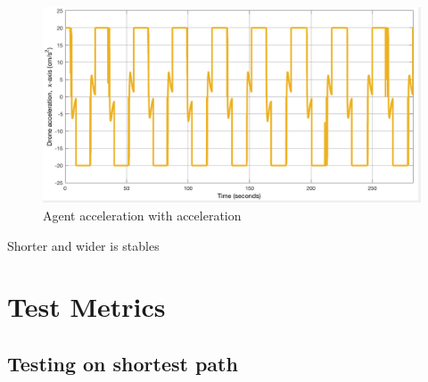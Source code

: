 \begin{figure}[H]
  \centering
  \includegraphics[width=1\columnwidth]{figures/SA_accel_post_final_adjustment}
  \caption{\label{fig:post_limit}Agent acceleration with acceleration}
\end{figure}

Shorter and wider is stables

\section{Test Metrics}
\label{sec:test_metrics}

\subsection{Testing on shortest path}



